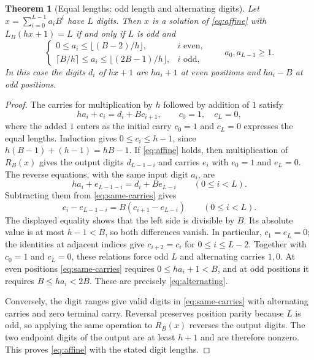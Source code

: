 \documentclass[11pt]{amsart}
\newtheorem{theorem}{Theorem}[section]
\theoremstyle{remark}\newtheorem{remark}[theorem]{Remark}
\newcommand{\rev}{R}
\begin{document}
\begin{theorem}[Equal lengths: odd length and alternating digits]\label{thm:division}
Let $x=\sum_{i=0}^{L-1}a_iB^i$ have $L$ digits.
Then $x$ is a solution of \eqref{eq:affine} with $L_B(hx+1)=L$ if and only if $L$ is odd and
\begin{equation}\label{eq:alternating}
 \begin{cases}
 0\le a_i\le \lfloor(B-2)/h\rfloor,&i\text{ even},\\
 \lceil B/h\rceil\le a_i\le\lfloor(2B-1)/h\rfloor,&i\text{ odd},
 \end{cases}
 \qquad a_0,a_{L-1}\ge1.
\end{equation}
In this case the digits $d_i$ of $hx+1$ are $ha_i+1$ at even positions and $ha_i-B$ at odd positions.
\end{theorem}
\begin{proof}
The carries for multiplication by $h$ followed by addition of $1$ satisfy
\begin{equation}\label{eq:same-carries}
 ha_i+c_i=d_i+Bc_{i+1},\qquad c_0=1,\quad c_L=0,
\end{equation}
where the added $1$ enters as the initial carry $c_0=1$ and $c_L=0$ expresses the equal lengths.
Induction gives $0\le c_i\le h-1$, since $h(B-1)+(h-1)=hB-1$.
If \eqref{eq:affine} holds, then multiplication of $\rev_B(x)$ gives the output digits $d_{L-1-i}$ and carries $e_i$ with $e_0=1$ and $e_L=0$.
The reverse equations, with the same input digit $a_i$, are
\[
 ha_i+e_{L-1-i}=d_i+Be_{L-i}\qquad(0\le i<L).
\]
Subtracting them from \eqref{eq:same-carries} gives
\[
 c_i-e_{L-1-i}=B(c_{i+1}-e_{L-i})\qquad(0\le i<L).
\]
The displayed equality shows that the left side is divisible by $B$. Its absolute value is at most $h-1<B$, so both differences vanish.
In particular, $c_1=e_L=0$; the identities at adjacent indices give $c_{i+2}=c_i$ for $0\le i\le L-2$.
Together with $c_0=1$ and $c_L=0$, these relations force odd $L$ and alternating carries $1,0$.
At even positions \eqref{eq:same-carries} requires $0\le ha_i+1<B$, and at odd positions it requires $B\le ha_i<2B$.
These are precisely \eqref{eq:alternating}.

Conversely, the digit ranges give valid digits in \eqref{eq:same-carries} with alternating carries and zero terminal carry.
Reversal preserves position parity because $L$ is odd, so applying the same operation to $\rev_B(x)$ reverses the output digits.
The two endpoint digits of the output are at least $h+1$ and are therefore nonzero.
This proves \eqref{eq:affine} with the stated digit lengths.
\end{proof}
\end{document}
